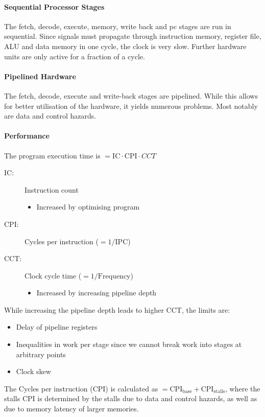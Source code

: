 \paragraph{Sequential Processor Stages}
The fetch, decode, execute, memory, write back and pc stages are run in sequential. Since signals must propagate through instruction memory, register file, ALU and data memory in one cycle, the clock is very slow. Further hardware units are only active for a fraction of a cycle.

\paragraph{Pipelined Hardware}
The fetch, decode, execute and write-back stages are pipelined. While this allows for better utilisation of the hardware, it yields numerous problems. Most notably are data and control hazards.

\paragraph{Performance}
The program execution time is $= \text{IC} \cdot \text{CPI} \cdot CCT$
\begin{description}
    \item[IC:] Instruction count
        \begin{itemize}
            \item Increased by optimising program
        \end{itemize}
    \item[CPI:] Cycles per instruction ($= 1/\text{IPC}$)
    \item[CCT:] Clock cycle time ($=1/\text{Frequency}$)
        \begin{itemize}
            \item Increased by increasing pipeline depth
        \end{itemize}
\end{description}

 While increasing the pipeline depth leads to higher CCT, the limits are:
 \begin{itemize}
     \item Delay of pipeline registers
     \item Inequalities in work per stage since we cannot break work into stages at arbitrary points
     \item Clock skew
 \end{itemize}

The Cycles per instruction (CPI) is calculated as $=\text{CPI}_{\text{base}} + \text{CPI}_{\text{stalls}}$, where the stalls CPI is determined by the stalls due to data and control hazards, as well as due to memory latency of larger memories.

